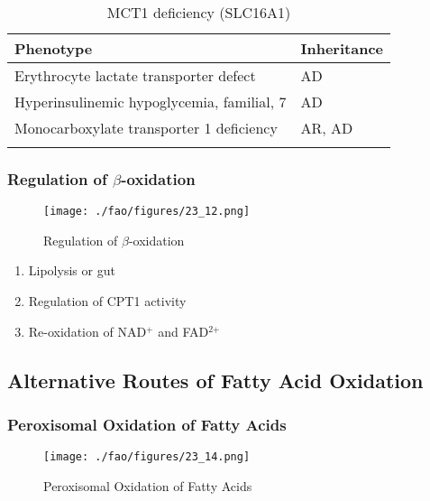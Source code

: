 \documentclass{scrartcl}
\begin{document}
\begin{table}[htbp]
\caption[Monocarboxylate Transporter 1]{\label{tab:orga275961}
MCT1 deficiency (SLC16A1)}
\centering
\begin{tabular}{ll}
Phenotype & Inheritance\\
\hline
Erythrocyte lactate transporter defect & AD\\
Hyperinsulinemic hypoglycemia, familial, 7\footnotemark & AD\\
Monocarboxylate transporter 1 deficiency & AR, AD\\
 & \\
\end{tabular}
\end{table}

\subsubsection{Regulation of \(\beta\)-oxidation}
\label{sec:org252602a}
\begin{figure}[htbp]
\centering
\texttt{[image: ./fao/figures/23\_12.png]}
\caption{\label{fig:org7761179}
Regulation of \(\beta\)-oxidation}
\end{figure}

\begin{enumerate}
\item Lipolysis or gut
\item Regulation of CPT1 activity
\item Re-oxidation of NAD\(^{\text{+}}\) and FAD\(^{\text{2+}}\)
\end{enumerate}

\subsection{Alternative Routes of Fatty Acid Oxidation}
\label{sec:orge9032a2}

\subsubsection{Peroxisomal Oxidation of Fatty Acids}
\label{sec:org7f20573}

\begin{figure}[htbp]
\centering
\texttt{[image: ./fao/figures/23\_14.png]}
\caption{\label{fig:org8ac3c05}
Peroxisomal Oxidation of Fatty Acids}
\end{figure}
\end{document}
